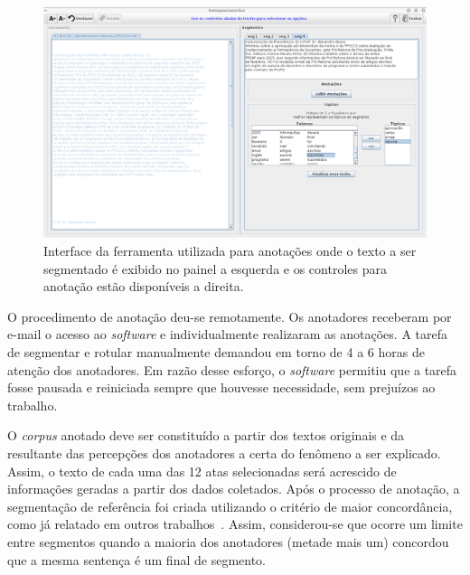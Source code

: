   \begin{figure}[!h]
	  \centering
	  \includegraphics[width=1\textwidth]{conteudo/capitulos/figs/interface-anotacoes.png}
	  \caption{Interface da ferramenta utilizada para anotações onde o texto a ser segmentado é exibido no painel a esquerda e os controles para anotação estão disponíveis a direita.}
	  \label{fig:interfaceanotacoes}
  \end{figure}



O procedimento de anotação deu-se remotamente. Os anotadores receberam por e-mail o acesso ao \textit{software} e individualmente realizaram as anotações. A tarefa de segmentar e rotular manualmente demandou em torno de 4 a 6 horas de atenção dos anotadores. Em razão desse esforço, o \textit{software} permitiu que a tarefa fosse pausada e reiniciada sempre que houvesse necessidade, sem prejuízos ao trabalho.



O \textit{corpus} anotado deve ser constituído a partir dos textos originais e da resultante das percepções dos anotadores a certa do fenômeno a ser explicado. Assim, o texto de cada uma das 12 atas selecionadas será acrescido de informações geradas a partir dos dados coletados. Após o processo de anotação, a segmentação de referência foi criada utilizando o critério de maior concordância, como já relatado em outros trabalhos~\cite{Hearst1997, Cardoso2017, Kazantseva2012, Passonneau1997, Galley2003}. Assim, considerou-se que ocorre um limite entre segmentos quando a maioria dos anotadores (metade mais um) concordou que a mesma sentença é um final de segmento. 

